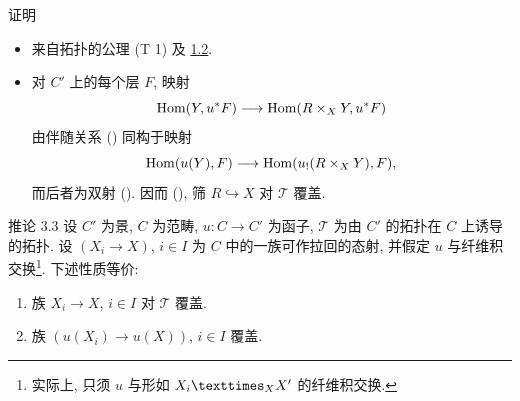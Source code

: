 \begin{enonce*}[remark]{证明}
\begin{itemize} %
\item[i) $\Rightarrow$ ii):] 来自拓扑的公理 (T 1) 及 \hyperref[III.prop1.2]{1.2}.

\item[ii) $\Rightarrow$ i):] 对 $C'$ 上的每个层 $F$, 映射
$$
\operatorname{Hom}(Y,u^{\ast}F)\longrightarrow \operatorname{Hom}(R\times_X Y, u^{\ast}F)
$$
由伴随关系\pageoriginale{} () 同构于映射
$$
\operatorname{Hom}(u(Y),F)\longrightarrow \operatorname{Hom}(u_{!}(R\times_X Y),F),
$$
而后者为双射 ().
因而 (), 筛 $R\hookrightarrow X$ 对 $𝒯$ 覆盖.
\end{itemize}
\end{enonce*}

\begin{enonce*}{推论 3.3}
设 $C'$ 为景, $C$ 为范畴, $u:C\rightarrow C'$ 为函子,
$𝒯$ 为由 $C'$ 的拓扑在 $C$ 上诱导的拓扑.
设 $(X_i\rightarrow X)$, $i\in I$ 为 $C$ 中的一族可作拉回的态射,
并假定 $u$ 与纤维积交换\footnote[2]{实际上, 只须 $u$ 与形如
$\fprod{X_i}{X'}{X}$ 的纤维积交换.}. 下述性质等价:
\begin{enumerate}
\renewcommand{\theenumi}{\roman{enumi}}
\renewcommand{\labelenumi}{\theenumi)}
\item 族 $X_i\rightarrow X$, $i\in I$ 对 $𝒯$ 覆盖.

\item 族 $(u(X_i)\rightarrow u(X))$, $i\in I$ 覆盖.
\end{enumerate}
\end{enonce*}

